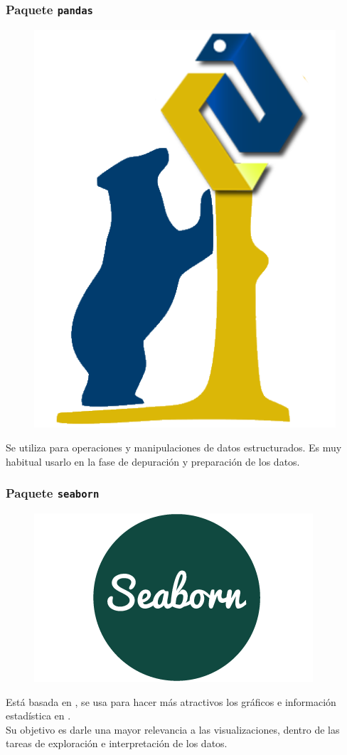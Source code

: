 \begin{frame}
\frametitle{Paquete \texttt{pandas}}
\begin{figure}
    \includegraphics[scale=0.15]{./Imagenes/pandas.png}
\end{figure}
Se utiliza para operaciones y manipulaciones de datos estructurados. Es muy habitual usarlo en la fase de depuración y preparación de los datos. 
\end{frame}
\begin{frame}
\frametitle{Paquete \texttt{seaborn}}
\begin{figure}
    \includegraphics[scale=0.25]{./Imagenes/seaborn.png}
\end{figure}
Está basada en , se usa para hacer más atractivos los gráficos e información estadística en \python.
\\
\bigskip
Su objetivo es darle una mayor relevancia a las visualizaciones, dentro  de las tareas de exploración e interpretación de los datos.
\end{frame}
